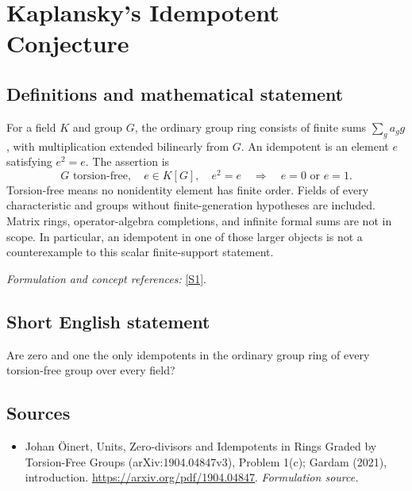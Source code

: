 \documentclass[11pt]{article}
\begin{document}
\section*{\texorpdfstring{Kaplansky's Idempotent Conjecture}{Kaplansky's Idempotent Conjecture}}\label{285}
\subsection{Definitions and mathematical statement}
For a field $K$ and group $G$, the ordinary group ring consists of finite sums $\sum_g a_gg$, with multiplication extended bilinearly from $G$. An idempotent is an element $e$ satisfying $e^2=e$. The assertion is
\[
 G\text{ torsion-free},\quad e\in K[G],\quad e^2=e
 \quad\Longrightarrow\quad e=0\text{ or }e=1.
\]
Torsion-free means no nonidentity element has finite order. Fields of every characteristic and groups without finite-generation hypotheses are included. Matrix rings, operator-algebra completions, and infinite formal sums are not in scope. In particular, an idempotent in one of those larger objects is not a counterexample to this scalar finite-support statement.
\par\smallskip\textit{Formulation and concept references:} \href{https://arxiv.org/pdf/1904.04847}{[S1]}.

\subsection{Short English statement}
Are zero and one the only idempotents in the ordinary group ring of every torsion-free group over every field?
\subsection{Sources}
\begin{itemize}
\item[S1]Johan Öinert, Units, Zero-divisors and Idempotents in Rings Graded by Torsion-Free Groups (arXiv:1904.04847v3), Problem 1(c); Gardam (2021), introduction.
\url{https://arxiv.org/pdf/1904.04847}.
\textit{Formulation source.}
\end{itemize}
\end{document}
